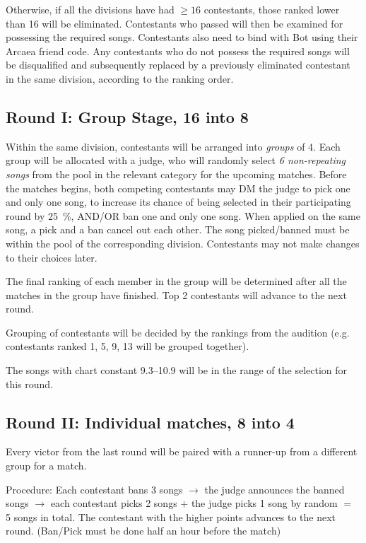 \documentclass{article}
\newcommand{\alert}[1]{{\color{red} #1}}
\begin{document}
Otherwise, if all the divisions have had $\geq 16$ contestants,
those ranked lower than 16 will be eliminated.
Contestants who passed will then be examined for
possessing the required songs.
Contestants also need to bind with Bot
using their Arcaea friend code.
Any contestants who do not possess the required songs
will be disqualified and subsequently
replaced by a previously eliminated
contestant in the same division,
according to the ranking order.

\subsection{Round I: Group Stage, 16 into 8}

Within the same division,
contestants will be arranged into \emph{groups} of 4.
Each group will be allocated with a judge,
who will randomly select \emph{6 non-repeating songs}
from the pool in the relevant category
for the upcoming matches.
Before the matches begins,
both competing contestants
may DM the judge to pick one and only one song,
to increase its chance of being selected
in their participating round by \qty{25}{\percent},
AND/OR ban one and only one song.
When applied on the same song,
a pick and a ban cancel out each other.
The song picked/banned must be within
the pool of the corresponding division.
Contestants may not make changes to their choices later.

The final ranking of each member in the group will be determined
after all the matches in the group have finished.
Top 2 contestants will advance to the next round.

Grouping of contestants will be decided
by the rankings from the audition
(e.g. contestants ranked 1, 5, 9, 13
will be grouped together).

\alert{
	The songs with chart constant 9.3--10.9
	will be in the range of the selection for this round.
}

\subsection{Round II: Individual matches, 8 into 4}

Every victor  %
from the last round
will be paired with a runner-up
from a different group for a match.

Procedure: Each contestant bans 3 songs $\rightarrow$
the judge announces the banned songs $\rightarrow$
each contestant picks 2 songs $+$ the judge picks 1 song by random $=$ 5 songs in total.
The contestant with the higher points advances to the next round.
(Ban/Pick must be done half an hour before the match)
\end{document}
